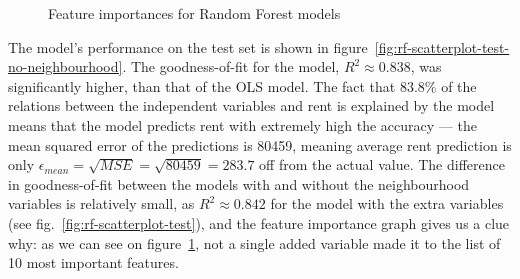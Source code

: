 \documentclass[12pt]{report}
\begin{document}
\begin{figure}[ht]
	\caption{Feature importances for Random Forest models}\label{fig:rf-importances}\end{figure}

The model's performance on the test set is shown in figure~\ref{fig:rf-scatterplot-test-no-neighbourhood}. The goodness-of-fit for the model, $R^2\approx0.838$, was significantly higher, than that of the OLS model. The fact that 83.8\% of the relations between the independent variables and rent is explained by the model means that the model predicts rent with extremely high the accuracy --- the mean squared error of the predictions is 80459, meaning average rent prediction is only $\epsilon_{mean}=\sqrt{MSE}=\sqrt{80459}=283.7$ off from the actual value. The difference in goodness-of-fit between the models with and without the neighbourhood variables is relatively small, as $R^2\approx0.842$ for the model with the extra variables (see fig.~\ref{fig:rf-scatterplot-test}), and the feature importance graph gives us a clue why: as we can see on figure~\ref{fig:rf-importances}, not a single added variable made it to the list of 10 most important features.
\end{document}
